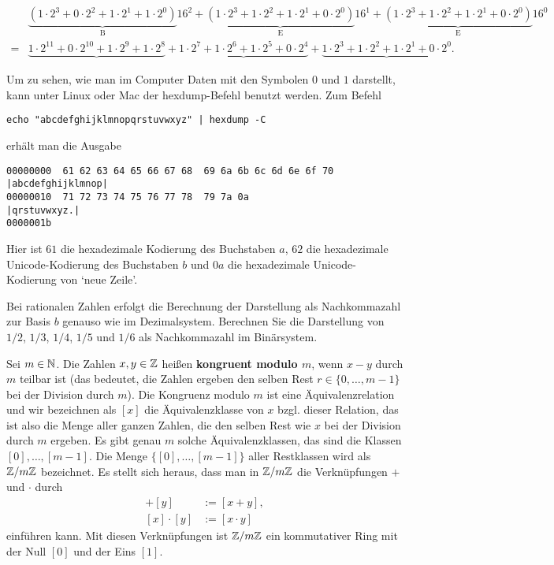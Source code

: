 \begin{bsp}
	{\small
	\begin{align*}
		& \underbrace{(1\cdot 2^3 + 0 \cdot 2^2 + 1 \cdot 2^1+ 1 \cdot 2^0)}_{\operatorname{B}} 16^2 + \underbrace{(1 \cdot 2^3 + 1 \cdot 2^2 + 1 \cdot 2^1 + 0 \cdot 2^0)}_{\operatorname{E}} 16^1 + \underbrace{(1 \cdot 2^3 + 1 \cdot 2^2 + 1 \cdot 2^1 + 0 \cdot 2^0)}_{\operatorname{E}} 16^0  
		\\ = & \underbrace{1 \cdot 2^{11} + 0 \cdot 2^{10} + 1 \cdot 2^9 + 1 \cdot 2^8} + \underbrace{1 \cdot 2^7 + 1\cdot 2^6 + 1 \cdot 2^5 + 0 \cdot 2^4} + \underbrace{1 \cdot 2^3 + 1 \cdot 2^2 + 1 \cdot 2^1 + 0 \cdot 2^0}. 
	\end{align*}
	}
\end{bsp}

\begin{bem} 
Um zu sehen, wie man im Computer Daten mit den Symbolen $0$ und $1$ darstellt, kann unter Linux oder Mac der hexdump-Befehl benutzt werden. Zum Befehl
{\scriptsize 
	\begin{verbatim}
echo "abcdefghijklmnopqrstuvwxyz" | hexdump -C
	\end{verbatim}
}
erhält man die Ausgabe 
{\scriptsize 
	\begin{verbatim}
00000000  61 62 63 64 65 66 67 68  69 6a 6b 6c 6d 6e 6f 70  |abcdefghijklmnop|
00000010  71 72 73 74 75 76 77 78  79 7a 0a                 |qrstuvwxyz.|
0000001b
	\end{verbatim}
}
Hier ist $61$ die hexadezimale Kodierung des Buchstaben $a$, $62$ die hexadezimale Unicode-Kodierung des Buchstaben $b$ und $0a$ die hexadezimale Unicode-Kodierung von `neue Zeile'. 
\end{bem} 


\begin{aufg}
	Bei rationalen Zahlen erfolgt die Berechnung der Darstellung als Nachkommazahl zur Basis $b$ genauso wie im Dezimalsystem. Berechnen Sie die Darstellung von $1/2$, $1/3$, $1/4$, $1/5$ und $1/6$ als Nachkommazahl im Binärsystem. 
\end{aufg}

\begin{bem}[Restklassenringe] 
	Sei $m \in \mathbb{N}$. Die Zahlen $x,y \in \mathbb{Z}$ heißen \textbf{kongruent modulo $m$}, wenn $x-y$ durch $m$ teilbar ist (das bedeutet, die Zahlen ergeben den selben Rest $r \in \{0,\ldots,m-1\}$ bei der Division durch $m$). Die Kongruenz modulo $m$ ist eine Äquivalenzrelation und wir bezeichnen als $[x]$ die Äquivalenzklasse von $x$ bzgl. dieser Relation, das ist also die Menge aller ganzen Zahlen, die den selben Rest wie $x$ bei der Division durch $m$ ergeben. Es gibt genau $m$ solche Äquivalenzklassen, das sind die Klassen $[0],\ldots,[m-1]$. Die Menge $\{[0],\ldots,[m-1]\}$ aller Restklassen wird als $\mathbb{Z} /m \mathbb{Z}$ bezeichnet. Es stellt sich heraus, dass man in $\mathbb{Z} / m \mathbb{Z}$ die Verknüpfungen $+$ und $\cdot$ durch 
	\begin{align*}
			[x]+ [y] & := [x+y],
			\\ [x] \cdot [y] & := [x\cdot y]
	\end{align*} 
einführen kann. Mit diesen Verknüpfungen ist $\mathbb{Z} / m \mathbb{Z}$ ein kommutativer Ring mit der Null $[0]$ und der Eins $[1]$. 
\end{bem} 

